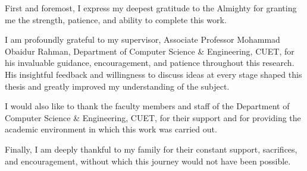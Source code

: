 \begin{acknowledgements}
First and foremost, I express my deepest gratitude to the Almighty for granting me the strength, patience, and ability to complete this work.

I am profoundly grateful to my supervisor, Associate Professor Mohammad Obaidur Rahman, Department of Computer Science \& Engineering, CUET, for his invaluable guidance, encouragement, and patience throughout this research. His insightful feedback and willingness to discuss ideas at every stage shaped this thesis and greatly improved my understanding of the subject.

I would also like to thank the faculty members and staff of the Department of Computer Science \& Engineering, CUET, for their support and for providing the academic environment in which this work was carried out.

Finally, I am deeply thankful to my family for their constant support, sacrifices, and encouragement, without which this journey would not have been possible.
\end{acknowledgements}
